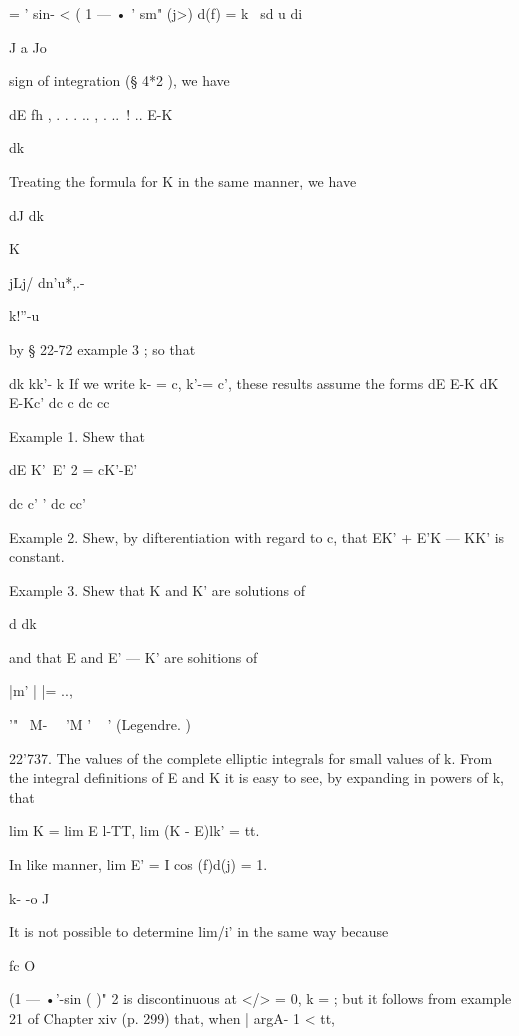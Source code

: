 =  ' sin- <  ( 1 —  • ' sm"  (j>)   d(f) = k \ sd  u di 

J a Jo 



sign of integration (§ 4*2 ), we have 

dE fh  , . . . .. ,  .   ..\ ! .. E-K 

dk 

Treating the formula for K in the same manner, we have 

dJ  
dk 

K 



jLj/ dn'u*,.- 



k!''-u 



by § 22-72 example 3 ; so that 

dk kk'- k 
If we write k- = c, k'-= c', these results assume the forms 
 dE E-K  dK E-Kc' 
dc c dc cc 

Example 1. Shew that 

 dE  K'~E' 2   = cK'-E' 

dc c' ' dc cc' 

Example 2. Shew, by difterentiation with regard to c, that EK' + E'K — KK' is 
constant. 



Example 3. Shew that K and K' are solutions of 

d  
dk 

and that E and E' — K' are sohitions of 



|m' | |= .., 



 '" ~M- \ \   'M '  ~  ' (Legendre. ) 



22'737. The values of the complete elliptic integrals for small values of k. 
From the integral definitions of E and K it is easy to see, by expanding 
in powers of k, that 

lim K = lim E l-TT, lim (K - E)lk' =   tt. 

In like manner, lim E' = I cos (f)d(j) = 1. 

k- -o J 

It is not possible to determine lim/i' in the same way because 

fc O 

(1 —  •'-sin ( )" 2 is discontinuous at </> = 0, k = ; but it follows from 
example 21 of Chapter xiv (p. 299) that, when | argA- 1 < tt, 

